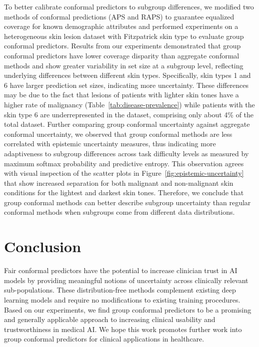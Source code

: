 \documentclass[letterpaper]{article} %
\begin{document}
To better calibrate conformal predictors to subgroup differences, we modified two methods of conformal predictions (APS and RAPS) to guarantee equalized coverage for known demographic attributes and performed experiments on a heterogeneous skin lesion dataset with Fitzpatrick skin type to evaluate group conformal predictors.
Results from our experiments demonstrated that group conformal predictors have lower coverage disparity than aggregate conformal methods and show greater variability in set size at a subgroup level, reflecting underlying differences between different skin types.
Specifically, skin types 1 and 6 have larger prediction set sizes, indicating more uncertainty.
These differences may be due to the fact that lesions of patients with lighter skin tones have a higher rate of malignancy (Table~\ref{tab:disease-prevalence}) while patients with the skin type 6 are underrepresented in the dataset, comprising only about 4\% of the total dataset.  Further comparing group conformal uncertainty against aggregate conformal uncertainty, we observed that group conformal methods are less correlated with epistemic uncertainty measures, thus indicating more adaptiveness to subgroup differences across task difficulty levels as measured by maximum softmax probability and predictive entropy.
This observation agrees with visual inspection of the scatter plots in Figure~\ref{fig:epistemic-uncertainty} that show increased separation for both malignant and non-malignant skin conditions for the lightest and darkest skin tones.
Therefore, we conclude that group conformal methods can better describe subgroup uncertainty than regular conformal methods when subgroups come from different data distributions.

\section{Conclusion}
Fair conformal predictors have the potential to increase clinician trust in AI models by providing meaningful notions of uncertainty across clinically relevant sub-populations.
These distribution-free methods complement existing deep learning models and require no modifications to existing training procedures.
Based on our experiments, we find group conformal predictors to be a promising and generally applicable approach to increasing clinical usability and trustworthiness in medical AI.
We hope this work promotes further work into group conformal predictors for clinical applications in healthcare.
\end{document}
